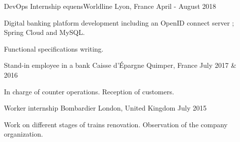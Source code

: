 

\begin{cventries}

  \cventry
    {DevOps Internship} %
    {equensWorldline} %
    {Lyon, France} %
    {April - August 2018} %
    {
      \begin{cvitems} %
        \item {Digital banking platform development including an OpenID connect server ; Spring Cloud and MySQL.}
        \item {Functional specifications writing.}
      \end{cvitems}
    } 

  \cventry
    {Stand-in employee in a bank} %
    {Caisse d'Épargne} %
    {Quimper, France} %
    {July 2017 \& 2016} %
    {
      \begin{cvitems} %
        \item {In charge of counter operations. Reception of customers.}
      \end{cvitems}
    } 

  \cventry
    {Worker internship} %
    {Bombardier} %
    {London, United Kingdom} %
    {July 2015} %
    {
      \begin{cvitems} %
        \item {Work on different stages of trains renovation. Observation of the company organization. }
      \end{cvitems}
    }


\end{cventries}
